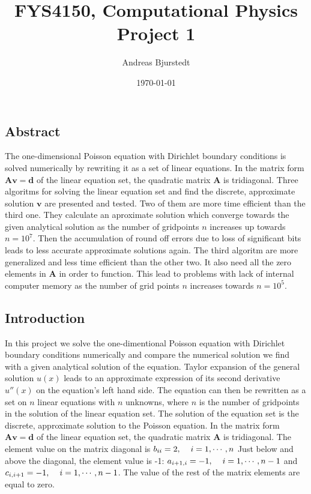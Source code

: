 \documentclass[11pt]{article}
\title{\bf FYS4150, Computational Physics \\Project 1}
\author{Andreas Bjurstedt}
\date{\today}
\begin{document}
\maketitle



\subsection*{Abstract}
The one-dimensional Poisson equation with Dirichlet boundary conditions is solved numerically
by rewriting it as a set of linear equations. In the matrix form 
$\mathbf{Av} = \mathbf d$ of the linear equation set, the quadratic matrix $\mathbf A$
is tridiagonal. Three algoritms for solving the linear equation set and find
the discrete, approximate solution ${\mathbf v}$ are presented and tested. Two of them are
more time efficient than the third one. They calculate an aproximate solution which
converge towards the given analytical solution as the number of gridpoints $n$ increases up
towards $n = 10^7$. Then the accumulation of round off errors due to loss of significant bits
leads to less accurate approximate solutions again. The third algoritm are more generalized
and less time efficient than the other two. It also need all the zero elements in $\mathbf A$
in order to function. This lead to problems with lack of internal computer memory as the number 
of grid points $n$ increases towards $n=10^5$. 

\subsection*{Introduction}
In this project we solve the one-dimentional Poisson equation with Dirichlet 
boundary conditions numerically and compare the numerical solution we find with a given 
analytical solution of the equation. Taylor expansion of the general solution $u(x)$ leads to
an approximate expression of its second derivative $u''(x)$ on the equation's left hand side.
The equation can then be rewritten as a set on $n$ linear equations with $n$ unknowns, where
$n$ is the number of gridpoints in the solution of the linear equation set. The solution of
the equation set is the discrete, approximate solution to the Poisson equation. In the matrix form 
$\mathbf{Av} = \mathbf d$ of the linear equation set, the quadratic matrix $\mathbf A$
is tridiagonal. The element value on the matrix diagonal is 
$b_{ii} = 2, \hspace{4mm} i = 1, \cdots, n$
Just below and above the diagonal, the element value is -1:
$a_{i+1,i} = -1, \hspace{4mm} i = 1, \cdots, n-1$ and $c_{i,i+1} = -1, 
\hspace{4mm} i = 1, \cdots, n -1$.
The value of the rest of the matrix elements are equal to zero.
\end{document}
